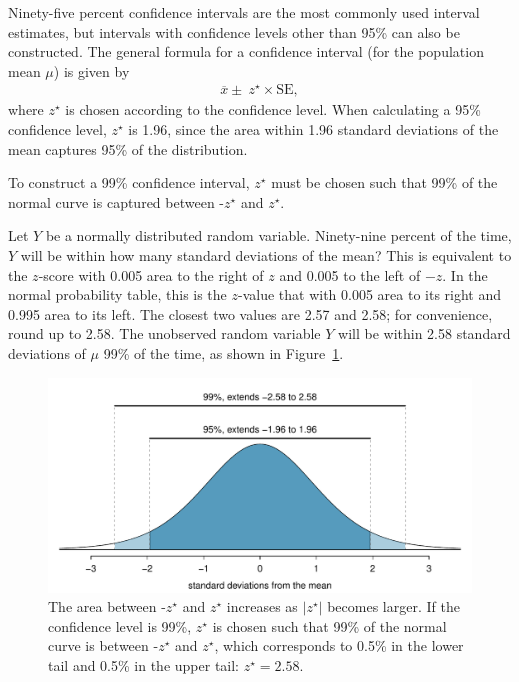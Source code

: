 
Ninety-five percent confidence intervals are the most commonly used interval estimates, but intervals with confidence levels other than 95\% can also be constructed. The general formula for a confidence interval (for the population mean $\mu$) is given by 
\begin{align}
	\overline{x} \pm \ z^{\star} \times \text{SE},
\end{align}
where $z^{\star}$ is chosen according to the confidence level. When calculating a 95\% confidence level, $z^{\star}$ is 1.96, since the area within 1.96 standard deviations of the mean captures 95\% of the distribution.

To construct a 99\% confidence interval, $z^{\star}$ must be chosen such that 99\% of the normal curve is captured between -$z^{\star}$ and $z^{\star}$.

\begin{examplewrap}
\begin{nexample}{Let $Y$ be a normally distributed random variable. Ninety-nine percent of the time, $Y$ will be within how many standard deviations of the mean?}
This is equivalent to the $z$-score with 0.005 area to the right of $z$ and 0.005 to the left of $-z$. In the normal probability table, this is the $z$-value that with 0.005 area to its right and 0.995 area to its left. The closest two values are 2.57 and 2.58; for convenience, round up to 2.58. The unobserved random variable $Y$ will be within 2.58 standard deviations of $\mu$ 99\% of the time, as shown in Figure~\ref{choosingZForCI}.
\end{nexample}
\end{examplewrap}

\begin{figure}[h]
\begin{centering}
	\includegraphics[width=\textwidth]
	{ch_inference_foundations_oi_biostat/figures/choosingZForCI/choosingZForCI.pdf}
	\caption{The area between -$z^{\star}$ and $z^{\star}$ increases as $|z^{\star}|$ becomes larger. If the confidence level is 99\%, $z^{\star}$ is chosen such that 99\% of the normal curve is between -$z^{\star}$ and $z^{\star}$, which corresponds to 0.5\% in the lower tail and 0.5\% in the upper tail: $z^{\star}=2.58$.}
	\label{choosingZForCI}
  \end{centering}
\end{figure}
 
